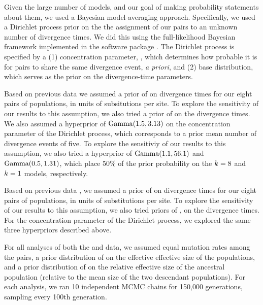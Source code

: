 Given the large number of models, and our goal of making probability statements
about them, we used a Bayesian model-averaging approach.
Specifically, we used a Dirichlet process prior on the the assignment of our
pairs to an unknown number of divergence times.
We did this using the full-likelihood Bayesian framework implemented in the
software package \ecoevolity \citep{Oaks2018ecoevolity}.
The Dirichlet process is specified by a
(1) concentration parameter, \concentration, which determines how probable it
is for pairs to share the same divergence event, \emph{a priori}, and
(2) base distribution, which serves as the prior on the divergence-time
parameters.

Based on previous data \citep{Welton2010, Welton2010zootaxa, Siler2010} we
assumed a prior of  on divergence times for our eight pairs
of  populations, in units of subsitutions per site.
To explore the sensitivity of our results to this assumption, we also
tried a prior of  on the divergence times.
We also assumed a hyperprior of $\textrm{Gamma}(1.5, 3.13)$ on the concentration
parameter of the Dirichlet process, which corresponds to a prior mean number of
divergence events of five.
To explore the sensitiviy of our results to this assumption, we also
tried a hyperprior of
$\textrm{Gamma}(1.1, 56.1)$
and
$\textrm{Gamma}(0.5, 1.31)$,
which place 50\% of the prior probability on the
$k_{} = 8$
and
$k_{} = 1$
models, respectively.


Based on previous data \citep{Siler2012, Siler2014kikuchii}, we assumed a prior
of  on divergence times for our eight pairs of 
populations, in units of substitutions per site.
To explore the sensitivity of our results to this assumption, we also tried
priors of ,  on the 
divergence times.
For the concentration parameter of the Dirichlet process, we explored the same
three hyperpriors described above.

For all analyses of both the  and  data, we
assumed equal mutation rates among the pairs, a prior distribution of
 on the effective effective size of the populations, and a
prior distribution of  on the relative effective size of the
ancestral population (relative to the mean size of the two descendant
populations).
For each analysis, we ran 10 independent MCMC chains for 150,000 generations,
sampling every 100th generation.


